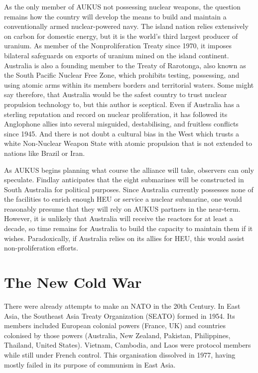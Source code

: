 \documentclass[letterpaper,12pt,twoside]{article} %
\begin{document}
\begin{multicols}{2}
As the only member of AUKUS not possessing nuclear weapons, the question remains how the country will develop the means to build and maintain a conventionally armed nuclear-powered navy. The island nation relies extensively on carbon for domestic energy, but it is the world's third largest producer of uranium. As member of the Nonproliferation Treaty since 1970, it imposes bilateral safeguards on exports of uranium mined on the island continent. Australia is also a founding member to the Treaty of Rarotonga, also known as the South Pacific Nuclear Free Zone, which prohibits testing, possessing, and using atomic arms within its members borders and territorial waters. Some might say therefore, that Australia would be the safest country to trust nuclear propulsion technology to, but this author is sceptical. Even if Australia has a sterling reputation and record on nuclear proliferation, it has followed its Anglophone allies into several misguided, destabilising, and fruitless conflicts since 1945. And there is not doubt a cultural bias in the West which trusts a white Non-Nuclear Weapon State with atomic propulsion that is not extended to nations like Brazil or Iran.

As AUKUS begins planning what course the alliance will take, observers can only speculate. Findlay anticipates that the eight submarines will be constructed in South Australia for political purposes\autocite[5]{findlay2021not}. Since Australia currently possesses none of the facilities to enrich enough HEU or service a nuclear submarine, one would reasonably presume that they will rely on AUKUS partners in the near-term. However, it is unlikely that Australia will receive the reactors for at least a decade,\autocite{tsuruoka2021aukus} so time remains for Australia to build the capacity to maintain them if it wishes. Paradoxically, if Australia relies on its allies for HEU, this would assist non-proliferation efforts.\autocite[7]{carlson2021aukus}


\vfill
\pagebreak
\section{The New Cold War}

There were already attempts to make an  NATO in the 20th Century. In East Asia, the Southeast Asia Treaty Organization (SEATO) formed in 1954. Its members included European colonial powers (France, UK) and countries colonised by those powers (Australia, New Zealand, Pakistan, Philippines, Thailand, United States). Vietnam, Cambodia, and Laos were protocol members while still under French control. This organisation dissolved in 1977, having mostly failed in its purpose of  communism in East Asia.


\end{multicols}
\end{document}
